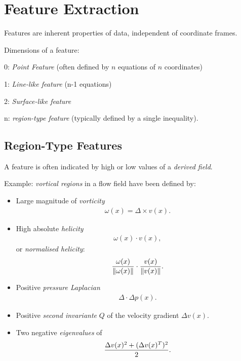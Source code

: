 \section{Feature Extraction}
Features are inherent properties of data, independent of coordinate frames.

Dimensions of a feature:
\begin{description}
\item 0: \emph{Point Feature} (often defined by $n$ equations of $n$ coordinates)
\item 1: \emph{Line-like feature} (n-1 equations)
\item 2: \emph{Surface-like feature}
\item n: \emph{region-type feature} (typically defined by a single inequality).
\end{description}

\subsection{Region-Type Features}
A feature is often indicated by high or low values of a \emph{derived field}. 

Example: \emph{vortical regions} in a flow field have been defined by:
\begin{itemize}
\item Large magnitude of \emph{vorticity}
    \begin{align*}
        \omega(x) = \Delta \times v(x).
    \end{align*}
\item High absolute \emph{helicity} 
    \begin{align*}
         \omega(x) \cdot v(x),
    \end{align*}
     or \emph{normalised helicity}:
     \begin{align*}
         { \omega(x)\over \left\lVert\omega(x)\right\rVert} \cdot {v(x)\over \left\lVert v(x)\right\rVert}.
     \end{align*}
\item Positive \emph{pressure Laplacian} 
    \begin{align*}
        \Delta \cdot \Delta p(x).
    \end{align*}
\item Positive \emph{second invariante} $Q$ of the velocity gradient $\Delta v(x)$.
\item Two negative \emph{eigenvalues} of
    \begin{align*}
        {\Delta v(x)^2 + (\Delta v(x)^T )^2 \over 2}.
    \end{align*}
\end{itemize}

